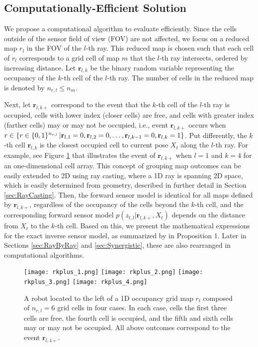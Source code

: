 \subsection{Computationally-Efficient Solution}

We propose a computational algorithm to evaluate  efficiently. 
Since the cells outside of the sensor field of view (FOV) are not affected, we focus on a reduced map $r_l$ in the FOV of the $l$-th ray. This reduced map is chosen such that each cell of $r_l$ corresponds to a grid cell of map $m$ that the $l$-th ray intersects, ordered by increasing distance. Let $\mathbf{r}_{l,k}$ be the binary random variable representing the occupancy of the $k$-th cell of the $l$-th ray. The number of cells in the reduced map is denoted by $n_{r,l}\leq n_m$.

Next, let $\mathbf{r}_{l,k+}$ correspond to the event that the $k$-th cell of the $l$-th ray is occupied, cells with lower index (closer cells) are free, and cells with greater index (farther cells) may or may not be occupied, i.e., event $\mathbf{r}_{l,k+}$ occurs when \\$r\in\left\{ r\in\{0,1\}^{{n_{r,l}}}\,|\mathbf{r}_{l,1}=0,\mathbf{r}_{l,2}=0,\ldots,\mathbf{r}_{l,k-1}=0,\mathbf{r}_{l,k}=1 \right\}$. Put differently, the $k$-th cell $\mathbf{r}_{l,k}$ is the closest occupied cell to current pose $X_t$ along the $l$-th ray. For example, see Figure \ref{fig:show_rkplus} that illustrates the event of $\mathbf{r}_{l,k+}$ when $l=1$ and $k=4$ for an one-dimensional cell array. This concept of grouping map outcomes can be easily extended to 2D using ray casting, where a 1D ray is spanning 2D space, which is easily determined from geometry, described in further detail in Section \ref{sec:RayCasting}. Then, the forward sensor model is identical for all maps defined by $\mathbf{r}_{l,k+}$, regardless of the occupancy of the cells beyond the $k$-th cell, and the corresponding forward sensor model $p(z_{t,l}|\mathbf{r}_{l,k+},X_{t})$ depends on the distance from $X_t$ to the $k$-th cell. Based on this, we present the mathematical expressions for the exact inverse sensor model, as summarized by  in Proposition 1. Later in Sections \ref{sec:RayByRay} and \ref{sec:Synergistic}, these are also rearranged in computational algorithms. 



\begin{figure}
  \centering
  \texttt{[image: rkplus\_1.png]}
    \centering
  \texttt{[image: rkplus\_2.png]}  
  \centering
  \texttt{[image: rkplus\_3.png]}
    \centering
  \texttt{[image: rkplus\_4.png]}
  \caption{A robot located to the left of a 1D occupancy grid map $r_l$ composed of $n_{r,l}=6$ grid cells in four cases. In each case, cells the first three cells are free, the fourth cell is occupied, and the fifth and sixth cells may or may not be occupied. All above outcomes correspond to the event $\mathbf{r}_{l,4+}$.}
  \label{fig:show_rkplus}
\end{figure}

